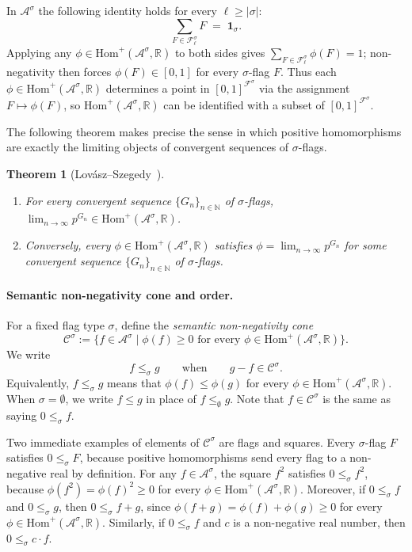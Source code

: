 \documentclass{article}
\newtheorem{theorem}{Theorem}[section]
\newcommand{\poshom}[1]{\mathrm{Hom}^+(\mathcal{A}^{#1}, \mathbb{R})}
\begin{document}
In $\mathcal{A}^\sigma$ the following identity holds for every $\ell \geq |\sigma|$:
\begin{equation}
  \sum_{F \in \mathcal{F}^\sigma_\ell} F \;=\; \mathbf{1}_\sigma.
  \label{eq:sum-to-one}
\end{equation}
Applying any $\phi \in \poshom{\sigma}$ to both sides gives
$\sum_{F \in \mathcal{F}^\sigma_\ell} \phi(F) = 1$;
non-negativity then forces $\phi(F) \in [0,1]$ for every $\sigma$-flag $F$.
Thus each $\phi \in \poshom{\sigma}$ determines a point in $[0,1]^{\mathcal{F}^\sigma}$
via the assignment $F \mapsto \phi(F)$, so $\poshom{\sigma}$ can be identified with
a subset of $[0,1]^{\mathcal{F}^\sigma}$.  %

The following theorem makes precise the sense in which positive homomorphisms
are exactly the limiting objects of convergent sequences of $\sigma$-flags.

\begin{theorem}[Lov\'{a}sz--Szegedy~{\cite{lovasz2006limits}}]\label{thm:convergent-hom}
  \begin{enumerate}
  \item[\textup{(a)}] For every convergent sequence $\{G_n\}_{n\in\mathbb{N}}$ of
    $\sigma$-flags, $\lim_{n\to\infty} p^{G_n} \in \poshom{\sigma}$.
  \item[\textup{(b)}] Conversely, every $\phi \in \poshom{\sigma}$ satisfies
    $\phi = \lim_{n\to\infty} p^{G_n}$ for some convergent sequence
    $\{G_n\}_{n\in\mathbb{N}}$ of $\sigma$-flags.
  \end{enumerate}
\end{theorem}

\paragraph{Semantic non-negativity cone and order.}
For a fixed flag type $\sigma$, define the \emph{semantic non-negativity cone}
\[
  \mathcal{C}^\sigma
  :=
  \{f \in \mathcal{A}^\sigma
    \mid \phi(f) \geq 0
    \text{ for every } \phi \in \poshom{\sigma}\}.
\]
We write
\[
  f \leq_\sigma g
  \qquad\text{when}\qquad
  g-f \in \mathcal{C}^\sigma.
\]
Equivalently, $f\leq_\sigma g$ means that
$\phi(f)\leq\phi(g)$ for every $\phi \in \poshom{\sigma}$.  When $\sigma=\emptyset$, we write $f \leq g$ in place of $f \leq_\emptyset g$.
Note that $f \in \mathcal{C}^\sigma$ is the same as saying $0 \leq_\sigma f$.

Two immediate examples of elements of $\mathcal{C}^\sigma$ are flags and squares.
Every $\sigma$-flag $F$ satisfies $0 \leq_\sigma F$,
because positive homomorphisms send every flag to a non-negative real by definition.
For any $f \in \mathcal{A}^\sigma$, the square $f^2$ satisfies $0 \leq_\sigma f^2$,
because $\phi(f^2) = \phi(f)^2 \geq 0$ for every $\phi \in \poshom{\sigma}$.
Moreover, if $0 \leq_\sigma f$ and $0 \leq_\sigma g$, then $0 \leq_\sigma f + g$,
since $\phi(f+g) = \phi(f) + \phi(g) \geq 0$ for every $\phi \in \poshom{\sigma}$.
Similarly, if $0 \leq_\sigma f$ and $c$ is a non-negative real number, then $0 \leq_\sigma c \cdot f$.
\end{document}
